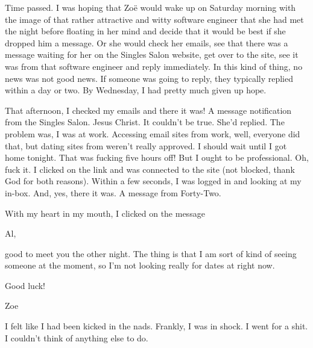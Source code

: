 Time passed. I was hoping that Zoë would wake up on Saturday
morning with the image of that rather attractive and witty software
engineer that she had met the night before floating in her mind and
decide that it would be best if she dropped him a message. Or she
would check her emails, see that there was a message waiting for her
on the Singles Salon website, get over to the site, see it was from
that software engineer and reply immediately. In this kind of thing,
no news was not good news. If someone was going to reply, they
typically replied within a day or two. By Wednesday, I had pretty
much given up hope.

That afternoon, I checked my emails and there it was! A message
notification from the Singles Salon. Jesus Christ. It couldn't be
true. She'd replied. The problem was, I was at work. Accessing email
sites from work, well, everyone did that, but dating sites from
weren't really approved. I should wait until I got home tonight.
That was fucking five hours off! But I ought to be professional. Oh,
fuck it. I clicked on the link and was connected to the site (not
blocked, thank God for both reasons). Within a few seconds, I was
logged in and looking at my in-box. And, yes, there it was. A
message from Forty-Two.

With my heart in my mouth, I clicked on the message

\startmessage
Al,

good to meet you the other night. The thing is that I am sort of
kind of seeing someone at the moment, so I'm not looking really for
dates at right now.

Good luck!

Zoe
\stopmessage

I felt like I had been kicked in the nads. Frankly, I was in shock.
I went for a shit. I couldn't think of anything else to do.

